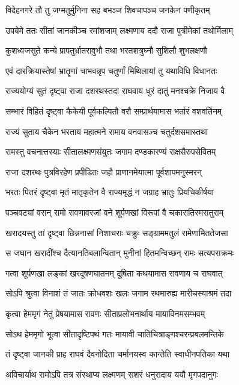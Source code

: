 \twolineshloka
{विदेहनगरे तौ तु जग्मतुर्मुनिना सह}
{बभञ्ज शिवचापञ्च जनकेन पणीकृतम्}%

\twolineshloka
{उपयेमे ततः सीतां जानकीञ्च रमांशजाम्}
{लक्ष्मणाय ददौ राजा पुत्रीमेकां तथोर्मिलाम्}%

\twolineshloka
{कुशध्वजसुते कन्ये प्रापतुर्भ्रातरावुभौ}
{तथा भरतशत्रुघ्नौ सुशिलौ शुभलक्षणौ}%

\twolineshloka
{एवं दारक्रियास्तेषां भ्रातॄणां चाभवन्नृप}
{चतुर्णां मिथिलायां तु यथाविधि विधानतः}%

\twolineshloka
{राज्ययोग्यं सुतं दृष्ट्वा राजा दशरथस्तदा}
{राघवाय धुरं दातुं मनश्चक्रे निजाय वै}%

\twolineshloka
{सम्भारं विहितं दृष्ट्वा कैकेयी पूर्वकल्पितौ}
{वरौ सम्प्रार्थयामास भर्तारं वशवर्तिनम्}%

\twolineshloka
{राज्यं सुताय चैकेन भरताय महात्मने}
{रामाय वनवासञ्च चतुर्दशसमास्तथा}%

\twolineshloka
{रामस्तु वचनात्तस्याः सीतालक्ष्मणसंयुतः}
{जगाम दण्डकारण्यं राक्षसैरुपसेवितम्}%

\twolineshloka
{राजा दशरथः पुत्रविरहेण प्रपीडितः}
{जहौ प्राणानमेयात्मा पूर्वशापमनुस्मरन्}%

\twolineshloka
{भरतः पितरं दृष्ट्वा मृतं मातृकृतेन वै}
{राज्यमृद्धं न जग्राह भ्रातुः प्रियचिकीर्षया}%

\twolineshloka
{पञ्चवट्यां वसन् रामो रावणावरजां वने}
{शूर्पणखां विरूपां वै चकारातिस्मरातुराम्}%

\twolineshloka
{खरादयस्तु तां दृष्ट्वा छिन्ननासां निशाचराः}
{चक्रुः सङ्ग्राममतुलं रामेणामिततेजसा}%

\twolineshloka
{स जघान खरादींश्च दैत्यानतिबलान्वितान्}
{मुनीनां हितमन्विच्छन् रामः सत्यपराक्रमः}%

\twolineshloka
{गत्वा शूर्पणखा लङ्कां खरदूषणघातनम्}
{दूषिता कथयामास रावणाय च राघवात्}%

\twolineshloka
{सोऽपि श्रुत्वा विनाशं तं जातः क्रोधवशः खलः}
{जगाम रथमारुह्य मारीचस्याश्रमं तदा}%

\twolineshloka
{कृत्वा हेममृगं नेतुं प्रेषयामास रावणः}
{सीताप्रलोभनार्थाय मायाविनमसम्भवम्}%

\twolineshloka
{सोऽथ हेममृगो भूत्वा सीतादृष्टिपथं गतः}
{मायावी चातिचित्राङ्गश्चरन्प्रबलमन्तिके}%

\twolineshloka
{तं दृष्ट्वा जानकी प्राह राघवं दैवनोदिता}
{चर्मानयस्व कान्तेति स्वाधीनपतिका यथा}%

\twolineshloka
{अविचार्याथ रामोऽपि तत्र संस्थाप्य लक्ष्मणम्}
{सशरं धनुरादाय ययौ मृगपदानुगः}%

